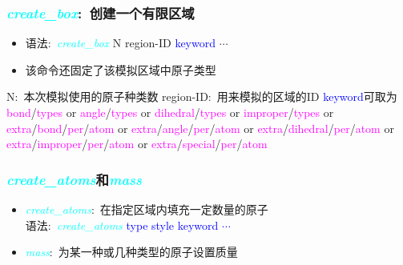 \frame
{
	\frametitle{\textcolor{cyan}{\textit{create\_box}}:~创建一个有限区域}
	\begin{itemize}
	\item 语法:~\textcolor{cyan}{\textit{create\_box}} \textrm{N region-ID \textcolor{blue}{keyword} $\cdots$}
	\item 该命令还固定了该模拟区域中原子类型
	\end{itemize}
		\textrm{N}:~本次模拟使用的原子种类数
\vskip 7pt			%
		\textrm{region-ID}:~用来模拟的区域的\textrm{ID}
\vskip 7pt			%
		\textrm{\textcolor{blue}{keyword}}可取为\\
		\textrm{\textcolor{magenta}{bond}/\textcolor{magenta}{types} or \textcolor{magenta}{angle}/\textcolor{magenta}{types} or \textcolor{magenta}{dihedral}/\textcolor{magenta}{types} or \textcolor{magenta}{improper}/\textcolor{magenta}{types} or \textcolor{magenta}{extra}/\textcolor{magenta}{bond}/\textcolor{magenta}{per}/\textcolor{magenta}{atom} or \textcolor{magenta}{extra}/\textcolor{magenta}{angle}/\textcolor{magenta}{per}/\textcolor{magenta}{atom} or \textcolor{magenta}{extra}/\textcolor{magenta}{dihedral}/\textcolor{magenta}{per}/\textcolor{magenta}{atom} or \textcolor{magenta}{extra}/\textcolor{magenta}{improper}/\textcolor{magenta}{per}/\textcolor{magenta}{atom} or \textcolor{magenta}{extra}/\textcolor{magenta}{special}/\textcolor{magenta}{per}/\textcolor{magenta}{atom}}
		\vskip 4pt
{\fontsize{7.5pt}{5.2pt}}
}

\frame
{
	\frametitle{\textcolor{cyan}{\textit{create\_atoms}}和\textcolor{cyan}{\textit{mass}}}
	\begin{itemize}
		\item \textcolor{cyan}{\textit{create\_atoms}}:~在指定区域内填充一定数量的原子\\
	语法:~\textcolor{cyan}{\textit{create\_atoms}} \textrm{\textcolor{blue}{type style keyword $\cdots$}}
	\vskip 4pt
	{\fontsize{7.5pt}{5.2pt}}

\item \textcolor{cyan}{\textit{mass}}:~为某一种或几种类型的原子设置质量
	\end{itemize}
}

